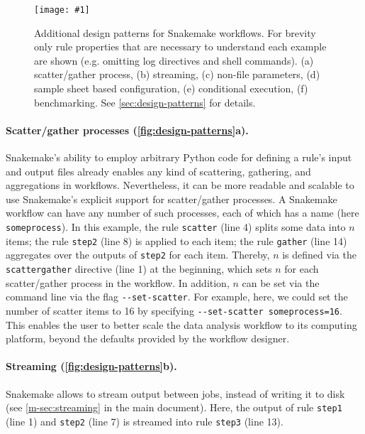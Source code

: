 \documentclass[10pt,a4paper,twocolumn]{article}
\newcommand{\image}[1]{\centering\texttt{[image: \#1]}}
\begin{document}
\begin{figure*}
	\image{design-patterns.pdf}
	\caption{Additional design patterns for Snakemake workflows.
		For brevity only rule properties that are necessary to understand each example are shown (e.g. omitting log directives and shell commands).
		(a) scatter/gather process, (b) streaming, (c) non-file parameters, (d) sample sheet based configuration, (e) conditional execution, (f) benchmarking.
		See \autoref{sec:design-patterns} for details.
	}\label{fig:design-patterns}
\end{figure*}

\paragraph{Scatter/gather processes (\autoref{fig:design-patterns}a).}
Snakemake's ability to employ arbitrary Python code for defining a rule's input and output files already enables any kind of scattering, gathering, and aggregations in workflows.
Nevertheless, it can be more readable and scalable to use Snakemake's explicit support for scatter/gather processes.
A Snakemake workflow can have any number of such processes, each of which has a name (here \lstinline!someprocess!).
In this example, the rule \lstinline!scatter! (line 4) splits some data into $n$ items; the rule \lstinline!step2! (line 8) is applied to each item; the rule \lstinline!gather! (line 14) aggregates over the outputs of \lstinline!step2! for each item.
Thereby, $n$ is defined via the \lstinline!scattergather! directive (line 1) at the beginning, which sets $n$ for each scatter/gather process in the workflow.
In addition, $n$ can be set via the command line via the flag \lstinline!--set-scatter!.
For example, here, we could set the number of scatter items to 16 by specifying \lstinline!--set-scatter someprocess=16!.
This enables the user to better scale the data analysis workflow to its computing platform, beyond the defaults provided by the workflow designer.

\paragraph{Streaming (\autoref{fig:design-patterns}b).}
Snakemake allows to stream output between jobs, instead of writing it to disk (see \autoref{m-sec:streaming} in the main document).
Here, the output of rule \lstinline!step1! (line 1) and \lstinline!step2! (line 7) is streamed into rule \lstinline!step3! (line 13).
\end{document}
